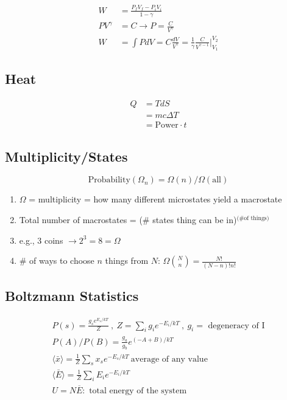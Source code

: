 \documentclass[10pt,letter]{article}
\begin{document}
\begin{align}
 W &= \frac{P_fV_f-P_iV_i}{1-\gamma}\\
 PV^\gamma  &= C \rightarrow P = \frac{C}{V^\gamma}\\
 W&= \int PdV = C\frac{dV}{V^\gamma} = \frac{1}{\gamma}\frac{C}{V^{\gamma - 1}} \Big\lvert ^{V_2}_{V_1}
\end{align}

\subsection{Heat}
\begin{align}
 Q &= TdS\\
 &= mc \Delta T\\
 &= \textrm{Power} \cdot t
\end{align}

\subsection{Multiplicity/States}
\begin{equation}
 \textrm{Probability}(\Omega_n) = \Omega(n)/\Omega(\textrm{all})
\end{equation}


\begin{enumerate}
    \item  $\Omega$ = multiplicity = how many different microstates yield a macrostate
    \item Total number of macrostates = (\# states thing can be in)$^\textrm{{(\# of things)}}$
    \item e.g., 3 coins $\rightarrow 2^3 = 8 = \Omega$
    \item \# of ways to choose $n$ things from $N$: $\Omega \binom{N}{n} = \frac{N!}{(N-n)!n!}$
\end{enumerate}

\subsection{Boltzmann Statistics}
\begin{align}
 P(s) = \frac{g_se^{E_s/kT}}{Z}~,~ Z = \sum\limits_i g_i e^{-E_i/kT}~,~g_i = \textrm{ degeneracy of I}\\
 P(A)/P(B) = \frac{g_a}{g_b} e^{(-A + B)/kT}\\
\langle \bar{x} \rangle = \frac{1}{Z}\sum \limits_s x_s e^{-E_s/kT}~ \textrm{average of any value}\\
\langle \bar{E} \rangle = \frac{1}{Z}\sum \limits_i E_i e^{-E_i/kT}\\
U=N\overline{E}: \textrm{ total energy of the system}
\end{align}
\end{document}
